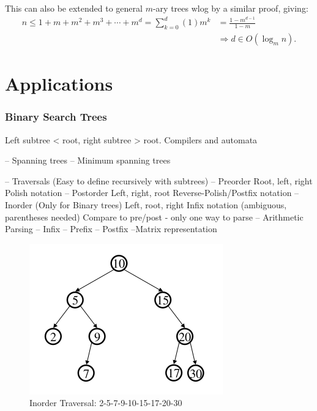 \documentclass[a4paper,10pt]{report}
\begin{document}
This can also be extended to general $m$-ary trees wlog by a similar proof, giving:
\begin{align*}
	n \leq 1 + m + m^2 + m^3 + \cdots + m^d = \sum_{k=0}^d (1)m^k &=\frac{1-m^{d-1}}{1-m}\\
	&\Rightarrow d \in O(\log_m n).
\end{align*}

\chapter{Applications}
\subsection{Binary Search Trees}
Left subtree < root, right subtree > root.
Compilers and automata

 -- Spanning trees
	-- Minimum spanning trees

 -- Traversals (Easy to define recursively with subtrees)
	-- Preorder
		Root, left, right
		Polish notation
	-- Postorder
		Left, right, root
		Reverse-Polish/Postfix notation
	-- Inorder (Only for Binary trees)
		Left, root, right
		Infix notation (ambiguous, parentheses needed)
			Compare to pre/post - only one way to parse
-- Arithmetic Parsing
	-- Infix
	-- Prefix
	-- Postfix
--Matrix representation

\begin{figure}[h!]
	\begin{centering}
	\begin{center}
	\includegraphics[width=\linewidth]{./Inorder.png}
	\caption{Inorder Traversal: 2-5-7-9-10-15-17-20-30}
	\label{fig:??????}
	\end{center}
	\par\end{centering}
\end{figure}
\end{document}
